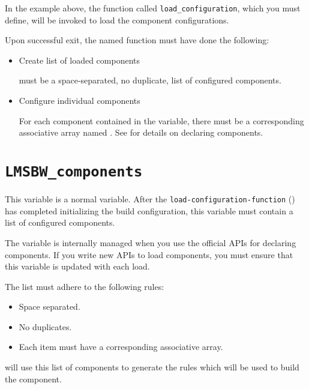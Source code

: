 In the example above, the function called
\texttt{load\_configuration}, which you must define, will be invoked
to load the component configurations.

Upon successful exit, the named function must have done the following:

\begin{itemize}
\item Create list of loaded components

  \lmsbwcomponents must be a space-separated, no duplicate, list of
  configured components.

\item Configure individual components

  For each component contained in the \lmsbwcomponents variable, there
  must be a corresponding associative array named
  .  See  for details
  on declaring components.

\end{itemize}

\section{\texttt{LMSBW\_components}}

This variable is a normal \make variable.  After the
\texttt{load-configuration-function}
() has completed initializing the
build configuration, this variable must contain a list of configured
components.

The variable is internally managed when you use the official APIs for
declaring components.  If you write new APIs to load components, you
must ensure that this variable is updated with each load.

The list must adhere to the following rules:

\begin{itemize}
\item Space separated.
\item No duplicates.
\item Each item must have a corresponding 
  associative array.
\end{itemize}

\lmsbw will use this list of components to generate the rules which
will be used to build the component.

